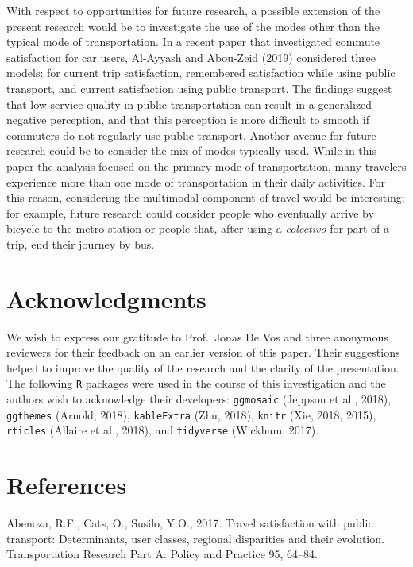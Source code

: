 \documentclass[]{elsarticle} %
\begin{document}
With respect to opportunities for future research, a possible extension
of the present research would be to investigate the use of the modes
other than the typical mode of transportation. In a recent paper that
investigated commute satisfaction for car users, Al-Ayyash and Abou-Zeid
(2019) considered three models: for current trip satisfaction,
remembered satisfaction while using public transport, and current
satisfaction using public transport. The findings suggest that low
service quality in public transportation can result in a generalized
negative perception, and that this perception is more difficult to
smooth if commuters do not regularly use public transport. Another
avenue for future research could be to consider the mix of modes
typically used. While in this paper the analysis focused on the primary
mode of transportation, many travelers experience more than one mode of
transportation in their daily activities. For this reason, considering
the multimodal component of travel would be interesting; for example,
future research could consider people who eventually arrive by bicycle
to the metro station or people that, after using a \emph{colectivo} for
part of a trip, end their journey by bus.

\hypertarget{acknowledgments}{%
\section{Acknowledgments}\label{acknowledgments}}

We wish to express our gratitude to Prof.~Jonas De Vos and three
anonymous reviewers for their feedback on an earlier version of this
paper. Their suggestions helped to improve the quality of the research
and the clarity of the presentation. The following \texttt{R} packages
were used in the course of this investigation and the authors wish to
acknowledge their developers: \texttt{ggmosaic} (Jeppson et al., 2018),
\texttt{ggthemes} (Arnold, 2018), \texttt{kableExtra} (Zhu, 2018),
\texttt{knitr} (Xie, 2018, 2015), \texttt{rticles} (Allaire et al.,
2018), and \texttt{tidyverse} (Wickham, 2017).

\hypertarget{references}{%
\section*{References}\label{references}}

\hypertarget{refs}{}
\leavevmode\hypertarget{ref-Abenoza2017travel}{}%
Abenoza, R.F., Cats, O., Susilo, Y.O., 2017. Travel satisfaction with
public transport: Determinants, user classes, regional disparities and
their evolution. Transportation Research Part A: Policy and Practice 95,
64--84.
\end{document}
